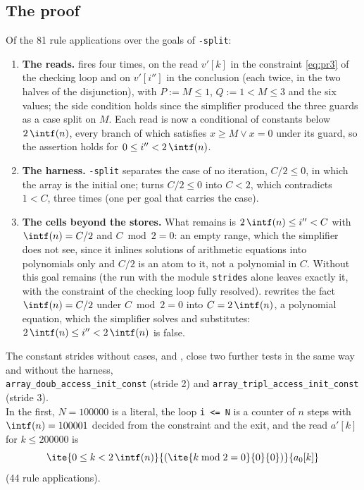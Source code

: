 \subsection{The proof}
Of the 81 rule applications over the goals of \texttt{-split}:
\begin{enumerate}[nosep]
\item \textbf{The reads.}  fires four times, on the read $v'[k]$
  in the constraint \eqref{eq:pr3} of the checking loop and on $v'[i'']$ in the conclusion (each twice, in
  the two halves of the disjunction), with $P := M \le 1$, $Q := 1 < M \le 3$ and the six values; the
  side condition holds since the simplifier produced the three guards as a case split on $M$. Each read
  is now a conditional of constants below $2\,\intf(n)$, every branch of which satisfies
  $x \ge M \vee x = 0$ under its guard, so the assertion holds for $0 \le i'' < 2\,\intf(n)$.
\item \textbf{The harness.} \texttt{-split} separates the case of no iteration, $C / 2 \le 0$, in which the
  array is the initial one;  turns $C / 2 \le 0$ into $C < 2$, which contradicts
  $1 < C$, three times (one per goal that carries the case).
\item \textbf{The cells beyond the stores.} What remains is $2\,\intf(n) \le i'' < C$ with $\intf(n) = C / 2$
  and $C \bmod 2 = 0$: an empty range, which the simplifier does not see, since it inlines solutions of
  arithmetic equations into polynomials only and $C / 2$ is an atom to it, not a polynomial in $C$. Without
   this goal remains (the run with the module \texttt{strides} alone leaves exactly it,
  with the constraint of the checking loop fully resolved).  rewrites the fact
  $\intf(n) = C / 2$ under $C \bmod 2 = 0$ into $C = 2\,\intf(n)$, a polynomial equation, which the
  simplifier solves and substitutes: $2\,\intf(n) \le i'' < 2\,\intf(n)$ is false.
\end{enumerate}
The constant strides without cases,  and , close two
further tests in the same way and without the harness,\\
\texttt{array\_doub\_access\_init\_const} (stride 2) and \texttt{array\_tripl\_access\_init\_const} (stride 3).\\
In the first, $N = 100000$ is a literal, the
loop \texttt{i <= N} is a counter of $n$ steps with $\intf(n) = 100001$ decided from the constraint and the
exit, and the read $a'[k]$ for $k \le 200000$ is
\[ \ite{0 \le k < 2\,\intf(n)}{(\ite{k \bmod 2 = 0}{0}{0})}{a_0[k]} \]
(44 rule applications).

